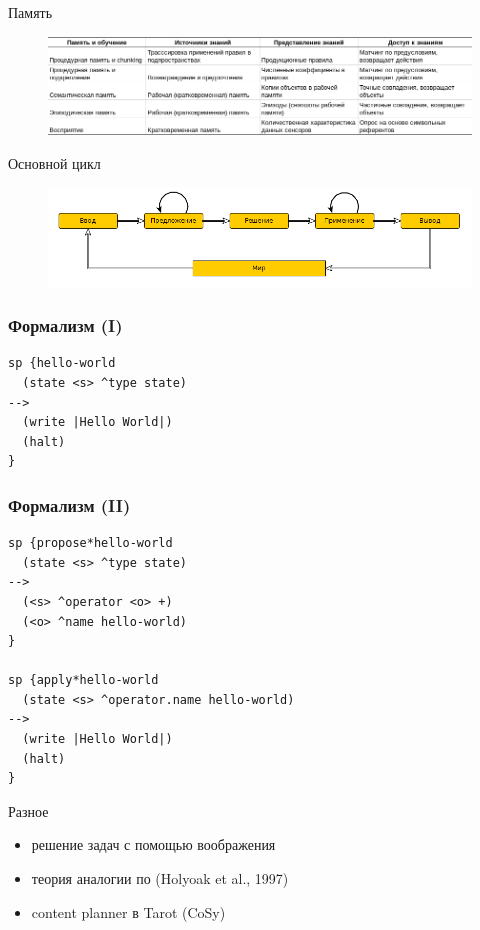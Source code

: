 \documentclass{beamer}
\begin{document}
\begin{frame}{Память}
\begin{center}
	\begin{figure}[H]
		\includegraphics[scale=0.35]{soar-memory.png} 
	\end{figure}
\end{center}
\end{frame}

\begin{frame}{Основной цикл}
\begin{center}
	\begin{figure}[H]
		\includegraphics[scale=0.36]{soar-cycle.png} 
	\end{figure}
\end{center}
\end{frame}


\begin{frame}[fragile]
\frametitle{Формализм (I)}
{\footnotesize \begin{verbatim}
sp {hello-world
  (state <s> ^type state)
-->
  (write |Hello World|)
  (halt)
}
\end{verbatim}}
\end{frame}

\begin{frame}[fragile]
\frametitle{Формализм (II)}
{\footnotesize \begin{verbatim}
sp {propose*hello-world
  (state <s> ^type state)
-->
  (<s> ^operator <o> +)
  (<o> ^name hello-world)
}

sp {apply*hello-world
  (state <s> ^operator.name hello-world)
-->
  (write |Hello World|)
  (halt)
}
\end{verbatim}}
\end{frame}

\begin{frame}{Разное}
\begin{itemize}
	\item решение задач с помощью воображения
	\medskip
	\item теория аналогии по (Holyoak et al., 1997)
	\medskip
	\item content planner в Tarot (CoSy)
\end{itemize}
\end{frame}
\end{document}
